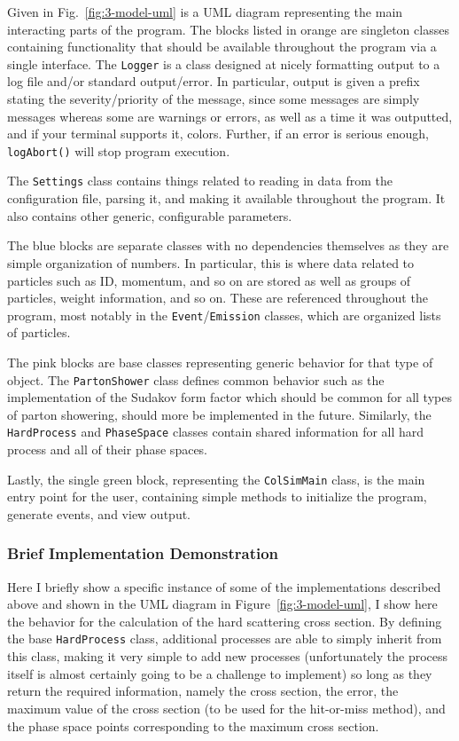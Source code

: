 Given in Fig.~\ref{fig:3-model-uml} is a UML diagram representing the main interacting parts of the program. The blocks listed in orange are singleton classes containing functionality that should be available throughout the program via a single interface. The \texttt{Logger} is a class designed at nicely formatting output to a log file and/or standard output/error. In particular, output is given a prefix stating the severity/priority of the message, since some messages are simply messages whereas some are warnings or errors, as well as a time it was outputted, and if your terminal supports it, colors. Further, if an error is serious enough, \texttt{logAbort()} will stop program execution.

The \texttt{Settings} class contains things related to reading in data from the configuration file, parsing it, and making it available throughout the program. It also contains other generic, configurable parameters.

The blue blocks are separate classes with no dependencies themselves as they are simple organization of numbers. In particular, this is where data related to particles such as ID, momentum, and so on are stored as well as groups of particles, weight information, and so on. These are referenced throughout the program, most notably in the \texttt{Event}/\texttt{Emission} classes, which are organized lists of particles.

The pink blocks are base classes representing generic behavior for that type of object. The \texttt{PartonShower} class defines common behavior such as the implementation of the Sudakov form factor which should be common for all types of parton showering, should more be implemented in the future. Similarly, the \texttt{HardProcess} and \texttt{PhaseSpace} classes contain shared information for all hard process and all of their phase spaces.

Lastly, the single green block, representing the \texttt{ColSimMain} class, is the main entry point for the user, containing simple methods to initialize the program, generate events, and view output.


\subsubsection{Brief Implementation Demonstration}

Here I briefly show a specific instance of some of the implementations described above and shown in the UML diagram in Figure~\ref{fig:3-model-uml}, I show here the behavior for the calculation of the hard scattering cross section. By defining the base \texttt{HardProcess} class, additional processes are able to simply inherit from this class, making it very simple to add new processes (unfortunately the process itself is almost certainly going to be a challenge to implement) so long as they return the required information, namely the cross section, the error, the maximum value of the cross section (to be used for the hit-or-miss method), and the phase space points corresponding to the maximum cross section.

